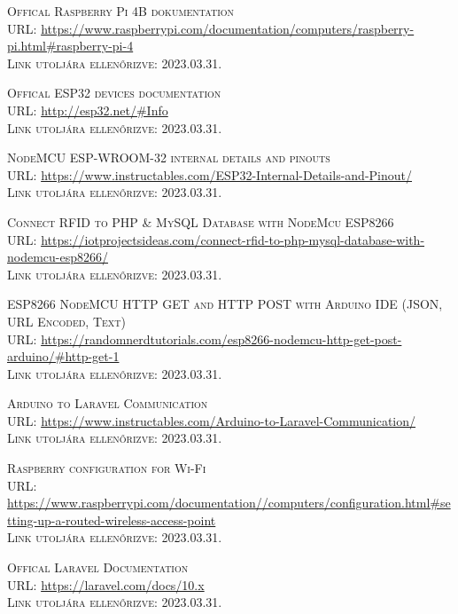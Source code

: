 \documentclass[
]{thesis-ekf}
\theoremstyle{definition}
\theoremstyle{remark}
\begin{document}
\begin{thebibliography}{20}
		\textsc{Offical Raspberry Pi 4B dokumentation}\\
		\textsc{URL:} \url{https://www.raspberrypi.com/documentation/computers/raspberry-pi.html#raspberry-pi-4}\\
		\textsc{Link utoljára ellenőrizve:} 2023.03.31.
		
		\textsc{Offical ESP32 devices documentation}\\
		\textsc{URL:} \url{http://esp32.net/#Info}\\
		\textsc{Link utoljára ellenőrizve:} 2023.03.31.
		
		\textsc{NodeMCU ESP-WROOM-32 internal details and pinouts}\\
		\textsc{URL:} \url{https://www.instructables.com/ESP32-Internal-Details-and-Pinout/}\\
		\textsc{Link utoljára ellenőrizve:} 2023.03.31.
		
		\textsc{Connect RFID to PHP \& MySQL Database with NodeMcu ESP8266}\\
		\textsc{URL:} \url{https://iotprojectsideas.com/connect-rfid-to-php-mysql-database-with-nodemcu-esp8266/}\\
		\textsc{Link utoljára ellenőrizve:} 2023.03.31.
		
		\textsc{ESP8266 NodeMCU HTTP GET and HTTP POST with Arduino IDE (JSON, URL Encoded, Text)}\\
		\textsc{URL:} \url{https://randomnerdtutorials.com/esp8266-nodemcu-http-get-post-arduino/#http-get-1}\\
		\textsc{Link utoljára ellenőrizve:} 2023.03.31.
		
		\textsc{Arduino to Laravel Communication}\\
		\textsc{URL:} \url{https://www.instructables.com/Arduino-to-Laravel-Communication/}\\
		\textsc{Link utoljára ellenőrizve:} 2023.03.31.
		
		\textsc{Raspberry configuration for Wi-Fi}\\
		\textsc{URL:} \url{https://www.raspberrypi.com/documentation//computers/configuration.html#setting-up-a-routed-wireless-access-point}\\
		\textsc{Link utoljára ellenőrizve:} 2023.03.31.
		
		\textsc{Offical Laravel Documentation}\\
		\textsc{URL:} \url{https://laravel.com/docs/10.x}\\
		\textsc{Link utoljára ellenőrizve:} 2023.03.31.
		

\end{thebibliography}
\end{document}
